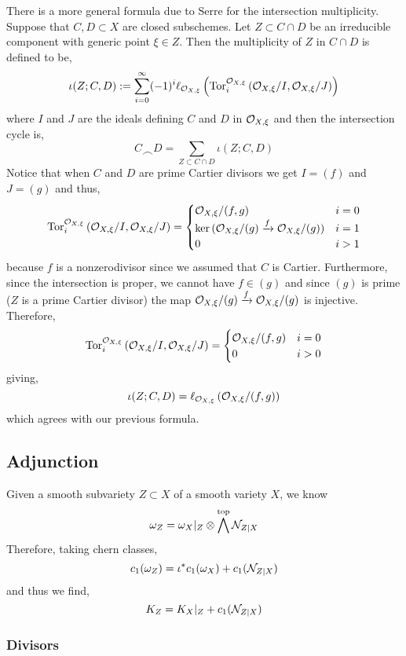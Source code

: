\documentclass[12pt]{article}
\begin{document}
\begin{rmk}
There is a more general formula due to Serre for the intersection multiplicity. Suppose that $C, D \subset X$ are closed subschemes. Let $Z \subset C \cap D$ be an irreducible component with generic point $\xi \in Z$. Then the multiplicity of $Z$ in $C \cap D$ is defined to be,
\[ \iota(Z; C, D) := \sum_{i = 0}^\infty (-1)^i \ell_{\mathcal{O}_{X, \xi}} \left( \mathrm{Tor}^{\mathcal{O}_{X, \xi}}_{i} \left( \mathcal{O}_{X, \xi}/I, \mathcal{O}_{X, \xi}/J \right) \right) \]
where $I$ and $J$ are the ideals defining $C$ and $D$ in $\mathcal{O}_{X, \xi}$ and then the intersection cycle is,
\[ C \frown D = \sum_{Z \subset C \cap D} \iota(Z; C, D) \]
Notice that when $C$ and $D$ are prime Cartier divisors we get $I = (f)$ and $J = (g)$ and thus,
\[ \mathrm{Tor}^{\mathcal{O}_{X, \xi}}_{i} \left( \mathcal{O}_{X, \xi}/I, \mathcal{O}_{X, \xi}/J \right)
= \begin{cases}
\mathcal{O}_{X, \xi}/(f,g) & i = 0
\\
\ker{(\mathcal{O}_{X, \xi}/(g) \xrightarrow{f} \mathcal{O}_{X, \xi}/(g))} & i = 1
\\
0 & i > 1
\end{cases} \]
because $f$ is a nonzerodivisor since we assumed that $C$ is Cartier. Furthermore, since the intersection is proper, we cannot have $f \in (g)$ and since $(g)$ is prime ($Z$ is a prime Cartier divisor) the map $\mathcal{O}_{X, \xi}/(g) \xrightarrow{f} \mathcal{O}_{X, \xi}/(g)$ is injective. Therefore,
\[ \mathrm{Tor}^{\mathcal{O}_{X, \xi}}_{i} \left( \mathcal{O}_{X, \xi}/I, \mathcal{O}_{X, \xi}/J \right)
= \begin{cases}
\mathcal{O}_{X, \xi}/(f,g) & i = 0
\\
0 & i > 0
\end{cases} \]
giving,
\[ \iota(Z; C, D) = \ell_{\mathcal{O}_{X, \xi}} \left( \mathcal{O}_{X, \xi}/(f, g) \right) \]
which agrees with our previous formula.
\end{rmk} 

\subsection{Adjunction}

Given a smooth subvariety $Z \subset X$ of a smooth variety $X$, we know
\[ \omega_Z = \omega_X |_Z \otimes \bigwedge^{\mathrm{top}} \mathcal{N}_{Z|X} \]
Therefore, taking chern classes,
\[ c_1(\omega_Z) = \iota^* c_1(\omega_X) + c_1(\mathcal{N}_{Z|X}) \]
and thus we find,
\[ K_Z = K_X |_Z + c_1(\mathcal{N}_{Z|X}) \]

\subsubsection{Divisors}
\end{document}
